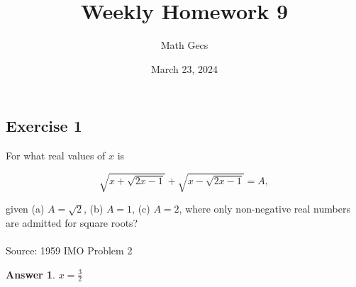 \documentclass[12pt]{article}
\title{Weekly Homework 9}
\author{Math Gecs}
\date{March 23, 2024}
\newtheorem*{answer*}{Answer}
\begin{document}
\maketitle

\subsection*{Exercise 1}
For what real values of $x$ is


$$ \sqrt{x+\sqrt{2x-1}} + \sqrt{x-\sqrt{2x-1}} = A,$$

given (a) $A=\sqrt{2}$, (b) $A=1$, (c) $A=2$, where only non-negative real numbers are admitted for square roots?
\\ \\
Source: 1959 IMO Problem 2\\

\begin{answer*}
$x= \frac{3}{2}$
\end{answer*}
\end{document}

